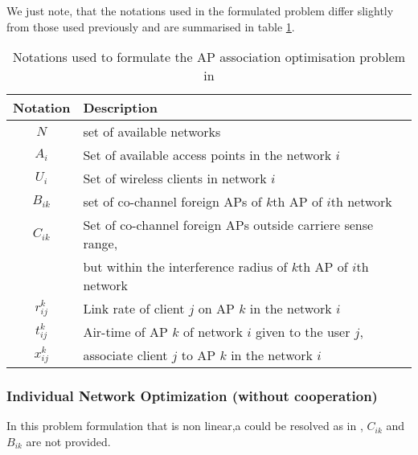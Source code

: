 \documentclass[journal,transmag]{IEEEtran}
\begin{document}
We just note, that the notations used in the formulated problem differ slightly from those used previously and are summarised in table \ref{problem_notations in 12}.

\begin{center} 
\begin{table}[htbp]
\centering
\begin{tabular}{|c|l|} %
\hline
Notation 		& Description \\
\hline
$N$ 				& set of available networks \\
$A_i$			& Set of available access points in the network $i$\\
$U_i$			& Set of wireless clients in network $i$\\
$B_{ik}$			& set of co-channel foreign APs of $k$th AP of $i$th network \\	
$C_{ik}$			& Set of co-channel foreign APs outside carriere sense range,\\
				& but within the interference radius of $k$th AP of $i$th network \\
$r_{ij}^k$ 		& Link rate of client $j$ on AP $k$ in the network $i$\\
$t_{ij}^k$		& Air-time of AP $k$ of network $i$ given to the user $j$, \\
$x_{ij}^k$		& associate client $j$ to AP $k$ in the network $i$\\

\hline
\end{tabular}
\label{problem_notations in 12}
\caption{Notations used to formulate the AP association optimisation problem in \cite{12Network_cooperation_AP_association}}
\end{table}
\end{center}

\subsubsection{Individual Network Optimization (without cooperation)}
In this problem formulation that is non linear,a could be resolved as in \cite{08proportional_fairness_multiRate_LAN}, $C_{ik}$ and $B_{ik}$ are not provided. 
\end{document}
